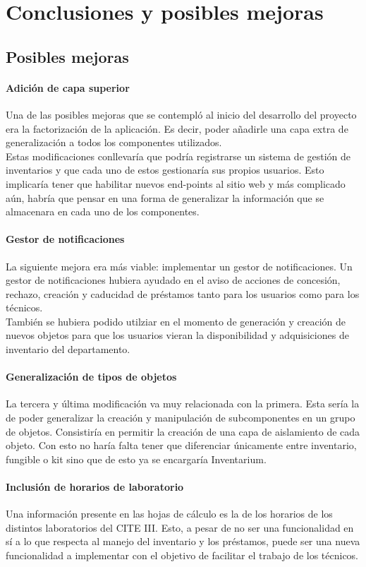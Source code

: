 \chapter{Conclusiones y posibles mejoras}
\section{Posibles mejoras}
\subsubsection{Adición de capa superior}
Una de las posibles mejoras que se contempló al inicio del desarrollo del proyecto era la factorización de la aplicación. Es decir, poder añadirle una capa extra de generalización a todos los componentes utilizados.
\\Estas modificaciones conllevaría que podría registrarse un sistema de gestión de inventarios y que cada uno de estos gestionaría sus propios usuarios. Esto implicaría tener que habilitar nuevos end-points al sitio web y más complicado aún, habría que pensar en una forma de generalizar la información que se almacenara en cada uno de los componentes.
\subsubsection{Gestor de notificaciones}
La siguiente mejora era más viable: implementar un gestor de notificaciones. Un gestor de notificaciones hubiera ayudado en el aviso de acciones de concesión, rechazo, creación y caducidad de préstamos tanto para los usuarios como para los técnicos.
\\También se hubiera podido utilziar en el momento de generación y creación de nuevos objetos para que los usuarios vieran la disponibilidad y adquisiciones de inventario del departamento.
\subsubsection{Generalización de tipos de objetos}
La tercera y última modificación va muy relacionada con la primera. Esta sería la de poder generalizar la creación y manipulación de subcomponentes en un grupo de objetos. Consistiría en permitir la creación de una capa de aislamiento de cada objeto. Con esto no haría falta tener que diferenciar únicamente entre inventario, fungible o kit sino que de esto ya se encargaría Inventarium.
\subsubsection{Inclusión de horarios de laboratorio}
Una información presente en las hojas de cálculo es la de los horarios de los distintos laboratorios del CITE III. Esto, a pesar de no ser una funcionalidad en sí a lo que respecta al manejo del inventario y los préstamos, puede ser una nueva funcionalidad a implementar con el objetivo de facilitar el trabajo de los técnicos.

